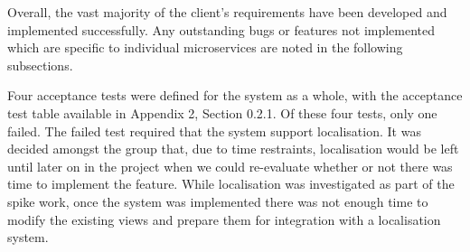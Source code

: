 Overall, the vast majority of the client's requirements have been developed and implemented successfully. Any outstanding bugs or features not implemented which are specific to individual microservices are noted in the following subsections.

Four acceptance tests were defined for the system as a whole, with the acceptance test table available in Appendix 2, Section 0.2.1. Of these four tests, only one failed. The failed test required that the system support localisation. It was decided amongst the group that, due to time restraints, localisation would be left until later on in the project when we could re-evaluate whether or not there was time to implement the feature. While localisation was investigated as part of the spike work, once the system was implemented there was not enough time to modify the existing views and prepare them for integration with a localisation system.